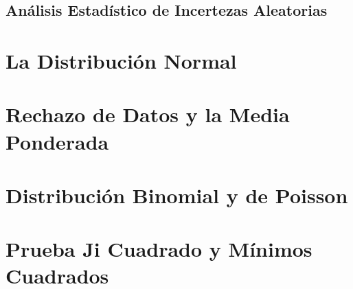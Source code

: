 \section{Análisis Estadístico de Incertezas Aleatorias}





\chapter{La Distribución Normal}










\chapter{Rechazo de Datos y la Media Ponderada}











\chapter{Distribución Binomial y de Poisson}










\chapter{Prueba Ji Cuadrado y Mínimos Cuadrados}














































